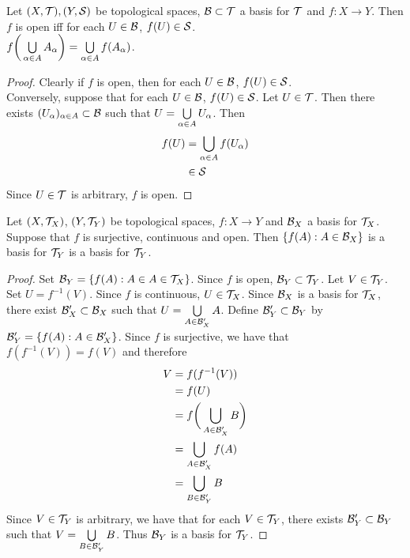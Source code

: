 \documentclass{book}
\begin{document}
	\begin{ex}
		Let $(X, \mathcal{T}), (Y, \mathcal{S})$ be topological spaces, $\mathcal{B} \subset \mathcal{T}$ a basis for $\mathcal{T}$ and $f: X \rightarrow Y$. Then $f$ is open iff for each $U \in \mathcal{B}$, $f(U) \in \mathcal{S}$.\\
		 $f\bigg( \bigcup\limits_{\alpha \in A} A_{\alpha} \bigg) =  \bigcup\limits_{\alpha \in A} f(A_{\alpha})$.
	\end{ex}

	\begin{proof}
		Clearly if $f$ is open, then for each $U \in \mathcal{B}$, $f(U) \in \mathcal{S}$.\\
		Conversely, suppose that for each $U \in \mathcal{B}$, $f(U) \in \mathcal{S}$. Let $U \in \mathcal{T}$. Then there exists $(U_{\alpha})_{\alpha \in A} \subset \mathcal{B}$ such that $U =  \bigcup\limits_{\alpha \in A} U_{\alpha}$. Then 
		\begin{align*}
			f(U) 
			& = \bigcup\limits_{\alpha \in A} f(U_{\alpha}) \\
			& \in \mathcal{S}
		\end{align*}
		Since $U \in \mathcal{T}$ is arbitrary, $f$ is open.
	\end{proof}

	\begin{ex}
		Let $(X, \mathcal{T}_X)$, $(Y, \mathcal{T}_Y)$ be topological spaces, $f:X \rightarrow Y$ and $\mathcal{B}_X$ a basis for $\mathcal{T}_X$.  Suppose that $f$ is surjective, continuous and open. Then $\{f(A): A \in \mathcal{B}_X\}$ is a basis for $\mathcal{T}_Y$ is a basis for $\mathcal{T}_Y$.
	\end{ex}
	
	\begin{proof}
		Set $\mathcal{B}_{Y} = \{f(A):A \in A \in \mathcal{T}_X\}$. Since $f$ is open, $\mathcal{B}_{Y} \subset \mathcal{T}_Y$. Let $V \in \mathcal{T}_Y$. Set $U = f^{-1}(V)$. Since $f$ is continuous, $U \in \mathcal{T}_X$. Since $\mathcal{B}_X$ is a basis for $\mathcal{T}_X$, there exist $\mathcal{B}_X' \subset \mathcal{B}_X$ such that $U = \bigcup\limits_{A \in \mathcal{B}_X'}A$. Define $\mathcal{B}_Y' \subset \mathcal{B}_Y$ by $\mathcal{B}_Y' = \{f(A): A \in \mathcal{B}_X'\}$. Since $f$ is surjective, we have that $f(f^{-1}(V)) = f(V)$ and therefore
		\begin{align*}
			V
			& = f(f^{-1}(V)) \\
			& = f(U) \\
			& = f \bigg( \bigcup_{A \in \mathcal{B}_X'} B \bigg) \\
			& = \bigcup_{A \in \mathcal{B}_X'} f(A) \\
			& = \bigcup_{B \in \mathcal{B}_Y'} B \\
		\end{align*} 
		Since $V \in \mathcal{T}_Y$ is arbitrary, we have that for each $V \in \mathcal{T}_Y$, there exists $\mathcal{B}_Y' \subset \mathcal{B}_Y$ such that $V = \bigcup\limits_{B \in \mathcal{B}_Y'} B$. Thus $\mathcal{B}_Y$ is a basis for $\mathcal{T}_Y$.
	\end{proof}
	
\end{document}
